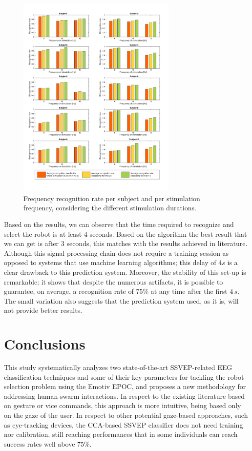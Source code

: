 \documentclass{svmult}
\begin{document}
\begin{figure}
\center
\includegraphics[width=0.7\textwidth]{figures/all-results-reconn.pdf}
\caption{Frequency recognition rate per subject and per stimulation frequency, considering the different stimulation durations.}
\label{fig:all-results-reconn}
\end{figure}

Based on the results, we can observe that the time required to recognize and select the robot is at least 4 seconds. Based on the algorithm the best result that we can get is after 3 seconds, this matches with the results achieved in literature. Although this signal processing chain does not require a training session as opposed to systems that use machine learning algorithms; this delay of 4$s$ is a clear drawback to this prediction system. Moreover, the stability of this set-up is remarkable: it shows that despite the numerous artifacts, it is possible to guarantee, on average, a recognition rate of 75\% at any time after the first $4\,s$. The small variation also suggests that the prediction system used, as it is, will not provide better results. 

\section{Conclusions}
This study systematically analyzes two state-of-the-art SSVEP-related EEG classification techniques and some of their key parameters for tackling the robot selection problem using the Emotiv EPOC, and proposes a new methodology for addressing human-swarm interactions. 
In respect to the existing literature based on gesture or vice commands, this approach is more intuitive, being based only on the gaze of the user. 
In respect to other potential gaze-based approaches, such as eye-tracking devices, the CCA-based SSVEP classifier does not need training nor calibration, still reaching performances that in some individuals can reach success rates well above 75\%.
\end{document}
